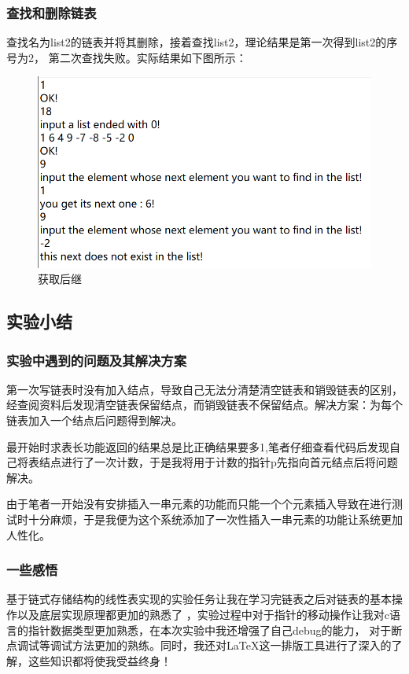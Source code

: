 \documentclass[supercite]{Experimental_Report}
\theoremstyle{definition}
\begin{document}
\subsubsection{查找和删除链表}
查找名为list2的链表并将其删除，接着查找list2，理论结果是第一次得到list2的序号为2， 第二次查找失败。实际结果如下图所示：
\begin{figure}[htbp]
	\centering
	\includegraphics[scale = 0.7]{images/8.png}
	\caption{获取后继}
\end{figure}

\newpage
\subsection{实验小结}
\subsubsection{实验中遇到的问题及其解决方案}
第一次写链表时没有加入结点，导致自己无法分清楚清空链表和销毁链表的区别，经查阅资料后发现清空链表保留结点，而销毁链表不保留结点。解决方案：为每个链表加入一个结点后问题得到解决。

最开始时求表长功能返回的结果总是比正确结果要多1,笔者仔细查看代码后发现自己将表结点进行了一次计数，于是我将用于计数的指针p先指向首元结点后将问题解决。

由于笔者一开始没有安排插入一串元素的功能而只能一个个元素插入导致在进行测试时十分麻烦，于是我便为这个系统添加了一次性插入一串元素的功能让系统更加人性化。
\subsubsection{一些感悟}
基于链式存储结构的线性表实现的实验任务让我在学习完链表之后对链表的基本操作以及底层实现原理都更加的熟悉了
，实验过程中对于指针的移动操作让我对c语言的指针数据类型更加熟悉，在本次实验中我还增强了自己debug的能力，
对于断点调试等调试方法更加的熟练。同时，我还对{\LaTeX}这一排版工具进行了深入的了解，这些知识都将使我受益终身！
\newpage
\end{document}
